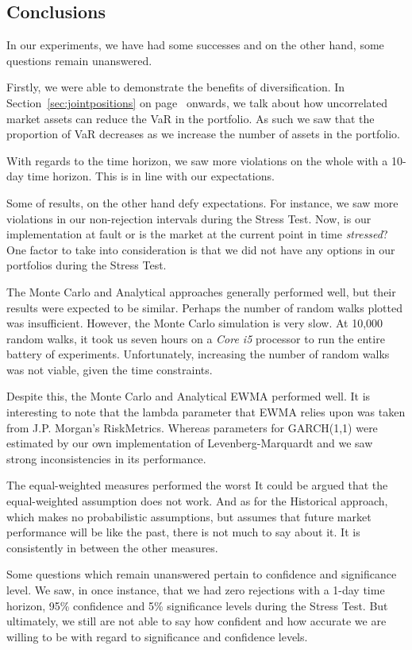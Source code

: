 \documentclass[../Dissertation.tex]{subfiles}
\begin{document}
\subsection{Conclusions}

In our experiments, we have had some successes and on the other hand, some questions remain unanswered.

Firstly, we were able to demonstrate the benefits of diversification.
In Section~\ref{sec:jointpositions} on page~\pageref{sec:jointpositions} onwards, we talk about how uncorrelated market assets can reduce the VaR in the portfolio.
As such we saw that the proportion of VaR decreases as we increase the number of assets in the portfolio.

With regards to the time horizon, we saw more violations on the whole with a 10-day time horizon.
This is in line with our expectations.

Some of results, on the other hand defy expectations.
For instance, we saw more violations in our non-rejection intervals during the Stress Test.
Now, is our implementation at fault or is the market at the current point in time \textit{stressed}?
One factor to take into consideration is that we did not have any options in our portfolios during the Stress Test.

The Monte Carlo and Analytical approaches generally performed well, but their results were expected to be similar.
Perhaps the number of random walks plotted was insufficient.
However, the Monte Carlo simulation is very slow.
At 10,000 random walks, it took us seven hours on a \textit{Core i5} processor to run the entire battery of experiments.
Unfortunately, increasing the number of random walks was not viable, given the time constraints.

Despite this, the Monte Carlo and Analytical EWMA performed well.
It is interesting to note that the lambda parameter that EWMA relies upon was taken from J.P. Morgan's RiskMetrics.
Whereas parameters for GARCH(1,1) were estimated by our own implementation of Levenberg-Marquardt and we saw strong inconsistencies in its performance.

The equal-weighted measures performed the worst
It could be argued that the equal-weighted assumption does not work.
And as for the Historical approach, which makes no probabilistic assumptions, but assumes that future market performance will be like the past, there is not much to say about it.
It is consistently in between the other measures.

Some questions which remain unanswered pertain to confidence and significance level.
We saw, in once instance, that we had zero rejections with a 1-day time horizon, 95\% confidence and 5\% significance levels during the Stress Test.
But ultimately, we still are not able to say how confident and how accurate we are willing to be with regard to significance and confidence levels.
\end{document}
